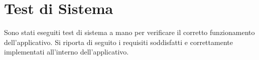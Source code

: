%
%

\section{Test di Sistema}{
	Sono stati eseguiti test di sistema  a mano  per verificare il corretto funzionamento dell'applicativo. Si riporta di seguito i requisiti soddisfatti e correttamente implementati all’interno dell’applicativo.
}
